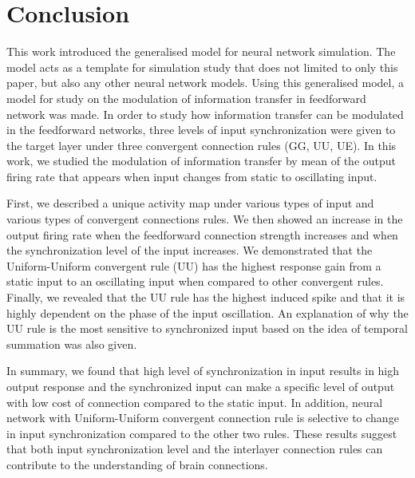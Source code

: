 \chapter{Conclusion}

This work introduced the generalised model for neural network simulation.  The model acts as a template for simulation study that does not limited to only this paper, but also any other neural network models. Using this generalised model, a model for study on the modulation of information transfer in feedforward network was made. 
In order to study how information transfer can be modulated in the feedforward networks, three levels of input synchronization were given to the target layer under three convergent connection rules (GG, UU, UE).  In this work, we studied the modulation of information transfer by mean of the output firing rate that appears when input changes from static to oscillating input.

First, we described a unique activity map under various types of input and various types of convergent connections rules. We then showed an increase in the output firing rate when the feedforward connection strength increases and when the synchronization level of the input increases. We demonstrated that the Uniform-Uniform convergent rule (UU) has the highest response gain from a static input to an oscillating input when compared to other convergent rules. Finally, we revealed that the UU rule has the highest induced spike and that it is highly dependent on the phase of the input oscillation. An explanation of why the UU rule is the most sensitive to synchronized input based on the idea of temporal summation was also given.


In summary, we found that high level of synchronization in input results in high output response and the synchronized input can make a specific level of output with low cost of connection compared to the static input. In addition, neural network with Uniform-Uniform convergent connection rule is selective to change in input synchronization compared to the other two rules. These results suggest that both input synchronization level and the interlayer connection rules can contribute to the understanding of brain connections. 

\paragraph{} 

